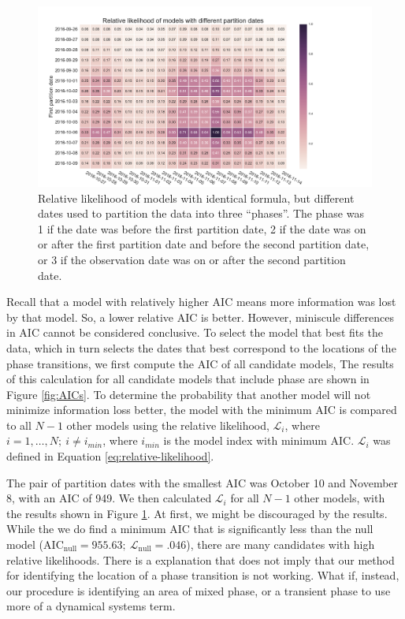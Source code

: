\begin{figure}
  \centering
  \hspace*{-.25in}
  \includegraphics[width=1.25\textwidth]{figures/rel_likelihood_dates-FIG2.pdf}

\caption{
  Relative likelihood of models with identical formula, but different dates
  used to partition the data into three ``phases''. The phase 
  was 1 if the date was before
  the first partition date, 2 if the date was on or after
  the first partition date and before the second partition date, or
  3 if the observation date was on or after the second partition date.
}
\label{fig:relative-likelihoods}
\end{figure}

Recall that a model with relatively higher AIC means more information was lost by
that model. So, a lower relative AIC is better. However, miniscule differences
in AIC cannot be considered conclusive. To select the model that best fits the
data, which in turn selects the dates that best correspond to the locations
of the phase transitions, we first compute the AIC of all candidate models, 
The results of this calculation for all candidate models that include phase
are shown in Figure \ref{fig:AICs}. To determine the probability that 
another model will not minimize information loss better,
the model with the minimum AIC is compared to all $N-1$ other models using
the relative likelihood, $\mathcal{L}_i$, where $i = 1, \ldots, N;~i \neq i_{min}$,
where $i_{min}$ is the model index with minimum AIC. $\mathcal{L}_i$ was defined
in Equation \ref{eq:relative-likelihood}. 

The pair of partition dates with the smallest AIC was October 10 and
November 8, with an AIC of 949. We then calculated $\mathcal{L}_i$ for all 
$N-1$ other models, 
with the results shown in Figure \ref{fig:relative-likelihoods}. At first,
we might be discouraged by the results. While the we do find a minimum
AIC that is significantly less than the null model 
($\mathrm{AIC}_{\mathrm{null}} = 955.63;~\mathcal{L}_{\mathrm{null}} = .046$),
there are many candidates with high relative likelihoods. 
There is a explanation that does not imply that our method for
identifying the location of a phase transition is not working. What if,
instead, our procedure is identifying an area of mixed phase, or a transient
phase to use more of a dynamical systems term. 
